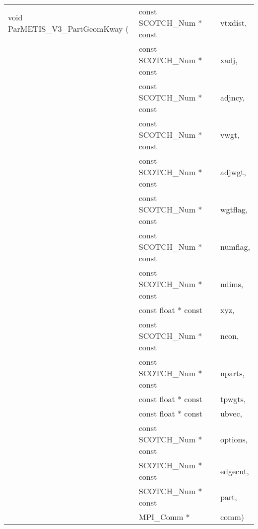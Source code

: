 \begin{itemize}
\progsyn

{\tt\begin{tabular}{l@{}ll}
void ParMETIS\_V3\_PartGeomKway ( & const SCOTCH\_Num * const & vtxdist, \\
                                  & const SCOTCH\_Num * const & xadj, \\
                                  & const SCOTCH\_Num * const & adjncy, \\
                                  & const SCOTCH\_Num * const & vwgt, \\
                                  & const SCOTCH\_Num * const & adjwgt, \\
                                  & const SCOTCH\_Num * const & wgtflag, \\
                                  & const SCOTCH\_Num * const & numflag, \\
                                  & const SCOTCH\_Num * const & ndims, \\
                                  & const float * const       & xyz, \\
                                  & const SCOTCH\_Num * const & ncon, \\
                                  & const SCOTCH\_Num * const & nparts, \\
                                  & const float * const       & tpwgts, \\
                                  & const float * const       & ubvec, \\
                                  & const SCOTCH\_Num * const & options, \\
                                  & SCOTCH\_Num * const       & edgecut, \\
                                  & SCOTCH\_Num * const       & part, \\
                                  & MPI\_Comm *               & comm)
\end{tabular}}


\end{itemize}

